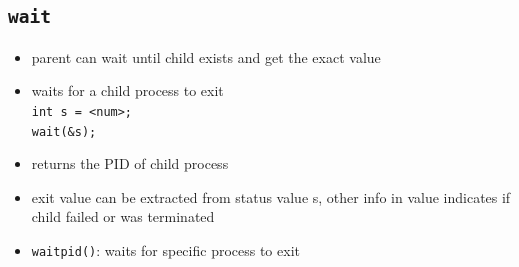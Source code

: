 \documentclass[10pt, multicolumn, a4paper]{article}
\begin{document}
\begin{multicols}{2}
	\subsection*{\texttt{wait}}
	\begin{itemize}
	\item parent can wait until child exists and get the exact value
	\item waits for a child process to exit \\ \verb|int s = <num>;| \\ \verb|wait(&s);|
	\item returns the PID of child process
	\item exit value can be extracted from status value s, other info in value indicates if child failed or was terminated
	\item \verb|waitpid()|: waits for specific process to exit
	\end{itemize}
\end{multicols}


\end{document}
